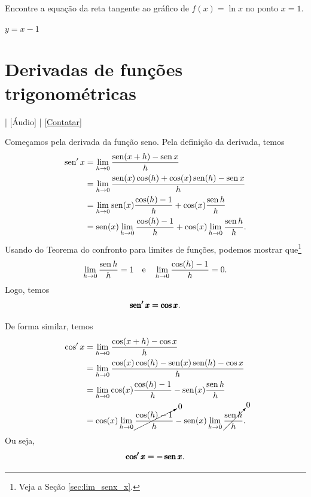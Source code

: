 \begin{exer}
  Encontre a equação da reta tangente ao gráfico de $f(x) = \ln x$ no ponto $x=1$.
\end{exer}
\begin{resp}
  $y = x-1$
\end{resp}

\section{Derivadas de funções trigonométricas}\label{cap_deriv_sec_trigo}

\begin{flushright}
  [Vídeo] | [Áudio] | \href{https://phkonzen.github.io/notas/contato.html}{[Contatar]}
\end{flushright}

Começamos pela derivada da função seno. Pela definição da derivada, temos
\begin{align}
  \operatorname{sen}' x &= \lim_{h\to 0} \frac{\operatorname{sen}(x+h) - \operatorname{sen} x}{h} \\
            &= \lim_{h\to 0} \frac{\operatorname{sen}(x)\cos(h)+\cos(x)\operatorname{sen}(h) - \operatorname{sen} x}{h} \\
            &= \lim_{h\to 0} \operatorname{sen}(x)\frac{\cos(h) - 1}{h} + \cos(x)\frac{\operatorname{sen} h}{h}\\
            &= \operatorname{sen}(x) \lim_{h\to 0} \frac{\cos(h)-1}{h} + \cos(x)\lim_{h\to 0} \frac{\operatorname{sen} h}{h}.
\end{align}
Usando do Teorema do confronto para limites de funções, podemos mostrar que\footnote{Veja a Seção \ref{sec:lim_senx_x}.}
\begin{equation}
  \lim_{h\to 0} \frac{\operatorname{sen} h}{h} = 1\quad\text{e}\quad\lim_{h\to 0} \frac{\cos(h) - 1}{h} = 0.
\end{equation}
Logo, temos
\begin{equation}
  \pmb{\operatorname{sen}' x = \cos x}.
\end{equation}

De forma similar, temos
\begin{align}
  \cos' x &= \lim_{h\to 0} \frac{\cos(x+h) - \cos x}{h} \\
            &= \lim_{h\to 0} \frac{\cos(x)\cos(h)-\operatorname{sen}(x)\operatorname{sen}(h) - \cos x}{h} \\
            &= \lim_{h\to 0} \cos(x)\frac{\cos(h) - 1}{h} - \operatorname{sen}(x)\frac{\operatorname{sen} h}{h}\\
            &= \cos(x) \lim_{h\to 0} \cancelto{0}{\frac{\cos(h)-1}{h}} - \operatorname{sen}(x)\lim_{h\to 0} \cancelto{0}{\frac{\operatorname{sen} h}{h}}.
\end{align}
Ou seja,
\begin{equation}
  \pmb{\cos' x = -\operatorname{sen} x}.
\end{equation}

